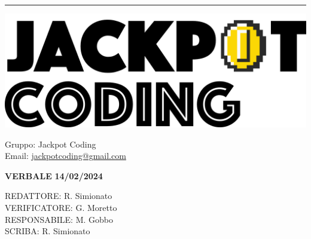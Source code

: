 \documentclass[5pt]{article}
\begin{document}
\hrule
\begin{minipage}[t]{0.50\textwidth}
    \begin{flushleft}
        \hspace{10pt}
        \includegraphics[scale=0.65]{jackpot-logo.png} 
    \end{flushleft}
\end{minipage}
\hspace{-60pt} %
\begin{flushright}
    \begin{minipage}[t]{0.50\textwidth}
        \begin{flushright}
            Gruppo: {\Large Jackpot Coding}\\
            Email: \href{mailto:jackpotcoding@gmail.com}{jackpotcoding@gmail.com}
        \end{flushright}
    \end{minipage}
\end{flushright}

\vspace{15pt}

\begin{center}
    \textbf{\large VERBALE }
    \textbf{\large 14/02/2024} \\
    \textbf{\Large}
\end{center}

\vspace{13pt}

\begin{flushleft}
    \begin{spacing}{1.5}
        REDATTORE:  R. Simionato \\
        VERIFICATORE:  G. Moretto\\%
        RESPONSABILE:  M. Gobbo\\%
        \vspace{7pt}
        SCRIBA: R. Simionato\\%
    \end{spacing}
\end{flushleft}
\end{document}
